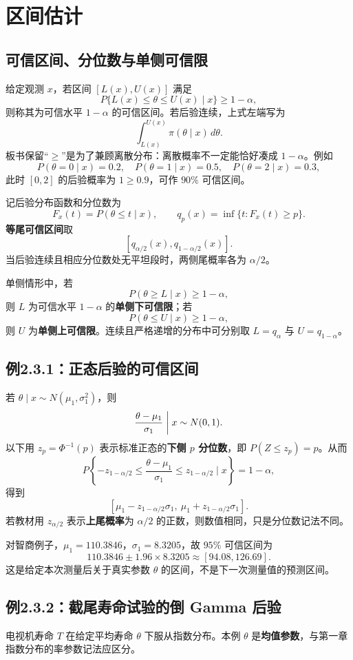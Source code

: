 \section{区间估计}
\subsection{可信区间、分位数与单侧可信限}
给定观测 $x$，若区间 $[L(x),U(x)]$ 满足
\[
P\{L(x)\leq\theta\leq U(x)\mid x\}\geq1-\alpha,
\]
则称其为可信水平 $1-\alpha$ 的可信区间。若后验连续，上式左端写为
\[
\int_{L(x)}^{U(x)}\pi(\theta\mid x)\,d\theta.
\]
板书保留“$\geq$”是为了兼顾离散分布：离散概率不一定能恰好凑成 $1-\alpha$。例如
\[
P(\theta=0\mid x)=0.2,\quad P(\theta=1\mid x)=0.5,\quad P(\theta=2\mid x)=0.3,
\]
此时 $[0,2]$ 的后验概率为 $1\geq0.9$，可作 $90\%$ 可信区间。

记后验分布函数和分位数为
\[
F_x(t)=P(\theta\leq t\mid x),\qquad
q_p(x)=\inf\{t:F_x(t)\geq p\}.
\]
\textbf{等尾可信区间}取
\[
\boxed{[q_{\alpha/2}(x),q_{1-\alpha/2}(x)].}
\]
当后验连续且相应分位数处无平坦段时，两侧尾概率各为 $\alpha/2$。

单侧情形中，若
\[
P(\theta\geq L\mid x)\geq1-\alpha,
\]
则 $L$ 为可信水平 $1-\alpha$ 的\textbf{单侧下可信限}；若
\[
P(\theta\leq U\mid x)\geq1-\alpha,
\]
则 $U$ 为\textbf{单侧上可信限}。连续且严格递增的分布中可分别取 $L=q_\alpha$ 与 $U=q_{1-\alpha}$。

\subsection{例2.3.1：正态后验的可信区间}
若 $\theta\mid x\sim N(\mu_1,\sigma_1^2)$，则
\[
\frac{\theta-\mu_1}{\sigma_1}\biggm|x\sim N(0,1).
\]
以下用 $z_p=\Phi^{-1}(p)$ 表示标准正态的\textbf{下侧 $p$ 分位数}，即 $P(Z\leq z_p)=p$。从而
\[
P\left\{-z_{1-\alpha/2}\leq\frac{\theta-\mu_1}{\sigma_1}
\leq z_{1-\alpha/2}\mid x\right\}=1-\alpha,
\]
得到
\[
\boxed{[\mu_1-z_{1-\alpha/2}\sigma_1,\ \mu_1+z_{1-\alpha/2}\sigma_1].}
\]
若教材用 $z_{\alpha/2}$ 表示\textbf{上尾概率}为 $\alpha/2$ 的正数，则数值相同，只是分位数记法不同。

对智商例子，$\mu_1=110.3846$，$\sigma_1=8.3205$，故 $95\%$ 可信区间为
\[
110.3846\pm1.96\times8.3205\approx[94.08,126.69].
\]
这是给定本次测量后关于真实参数 $\theta$ 的区间，不是下一次测量值的预测区间。

\subsection{例2.3.2：截尾寿命试验的倒 Gamma 后验}
电视机寿命 $T$ 在给定平均寿命 $\theta$ 下服从指数分布。本例 $\theta$ 是\textbf{均值参数}，与第一章指数分布的率参数记法应区分。

